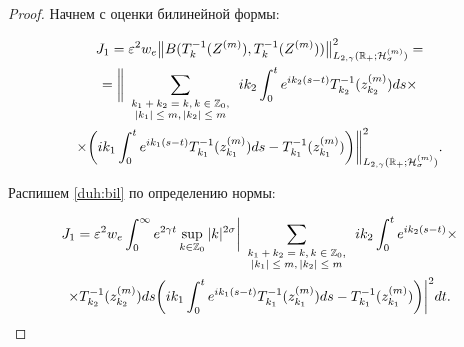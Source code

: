 \begin{proof} Начнем с оценки билинейной формы:

\begin{multline}

J_1=\varepsilon^2 w_e\bigl\| B(T^{-1}_{k}(Z^{(m)}),T^{-1}_{k}(Z^{(m)})) \bigr\| ^2_{L_{2,\gamma}(\mathbb R_{+};{\cal H}^{(m)}_{\sigma})}=

\\

=\biggl\| 

\sum_{\scriptsize

\begin{array}{c}

 k_1+k_2=k, k\in \mathbb Z_0, \\ 

 |k_1|\le m,|k_2|\le m

\end{array}

} ik_2\int_0^t e^{ik_2(s-t)}T^{-1}_{k_2}(z_{k_2}^{(m)})ds\times 

\\

\times \biggl(ik_1\int_0^t e^{ik_1(s-t)}T^{-1}_{k_1}(z_{k_1}^{(m)})ds-T^{-1}_{k_1}(z_{k_1}^{(m)})\biggr)\biggr\|^2_{L_{2,\gamma}(\mathbb R_{+};{\cal H}^{(m)}_{\sigma})}.

\label{duh:bil}

\end{multline}

Распишем \eqref{duh:bil} по определению нормы:

\begin{multline*}

J_1=\varepsilon^2 w_e\int_0^\infty e^{2\gamma t} 

\sup_{k\in \mathbb Z_0} |k|^{2\sigma} 

\biggl|\sum_{

\scriptsize

\begin{array}{c}

k_1+k_2=k, k\in \mathbb Z_0, \\

|k_1|\le m,|k_2|\le m

\end{array}

} ik_2\int_0^t e^{ik_2(s-t)} \times

\\

\times T^{-1}_{k_2}(z_{k_2}^{(m)})ds\biggl(ik_1\int_0^t e^{ik_1(s-t)}T^{-1}_{k_1}(z_{k_1}^{(m)})ds-T^{-1}_{k_1}(z_{k_1}^{(m)})\biggr) \biggr|^2dt.


\end{multline*}
\end{proof}

